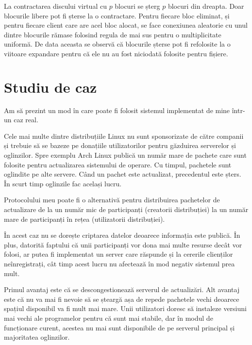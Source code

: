 \documentclass[a4wide,12pt]{report}
\begin{document}
La contractarea discului virtual cu $p$ blocuri se șterg $p$ blocuri din dreapta. Doar blocurile libere pot fi șterse la
o contractare. Pentru fiecare bloc eliminat, și pentru fiecare client care are acel bloc alocat, se face conexiunea
aleatorie cu unul dintre blocurile rămase folosind regula de mai sus pentru o multiplicitate uniformă.  De data aceasta
se observă că blocurile șterse pot fi refolosite la o viitoare expandare pentru că ele nu au fost niciodată folosite
pentru fișiere.

\section{Studiu de caz} %

Am să prezint un mod în care poate fi folosit sistemul implementat de mine într-un caz real.

Cele mai multe dintre distribuțiile Linux nu sunt sponsorizate de către companii și trebuie să se bazeze pe donațiile
utilizatorilor pentru găzduirea serverelor și oglinzilor. Spre exemplu Arch Linux publică un număr mare de pachete care
sunt folosite pentru actualizarea sistemului de operare. Cu timpul, pachetele sunt oglindite pe alte servere. Când un
pachet este actualizat, precedentul este șters. În scurt timp oglinzile fac același lucru.

Protocolului meu poate fi o alternativă pentru distribuirea pachetelor de actualizare de la un număr mic de participanți
(creatorii distribuției) la un număr mare de participanți în rețea (utilizatorii distribuției).

În acest caz nu se dorește criptarea datelor deoarece informația este publică. În plus, datorită faptului că unii
participanți vor dona mai multe resurse decât vor folosi, ar putea fi implementat un server care răspunde și la cererile
clienților neînregistrați, cât timp acest lucru nu afectează în mod negativ sistemul prea mult.

Primul avantaj este că se descongestionează serverul de actualizări. Alt avantaj este că nu va mai fi nevoie să se
șteargă așa de repede pachetele vechi deoarece spațiul disponibil va fi mult mai mare. Unii utilizatori doresc să
instaleze versiuni mai vechi ale programelor pentru că sunt mai stabile, dar în modul de funcționare curent, acestea nu
mai sunt disponibile de pe serverul principal și majoritatea oglinzilor.

\end{document}
